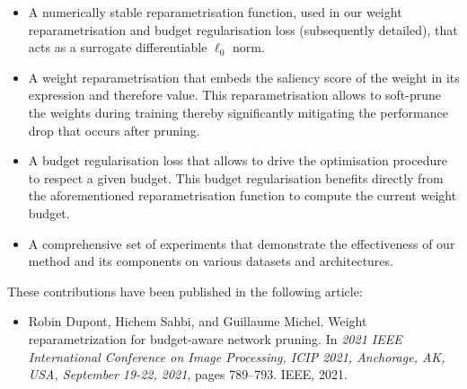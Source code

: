 \begin{itemize}
      \item A numerically stable reparametrisation function, used in our weight
            reparametrisation and budget regularisation loss (subsequently
            detailed), that acts as a surrogate differentiable $\ell_0$ norm.

      \item A weight reparametrisation that embeds the saliency score of the
            weight in its expression and therefore value. This reparametrisation
            allows to soft-prune the weights during training thereby significantly
            mitigating the performance drop that occurs after pruning. \DIFaddbegin {}\DIFaddend 

      \item A budget regularisation loss that allows to drive the optimisation
            procedure to respect a given budget. This budget regularisation
            benefits directly from the aforementioned reparametrisation function
            to compute the current weight budget. \DIFaddbegin {}\DIFaddend 

      \item A comprehensive set of experiments that demonstrate the effectiveness
            of our method and \DIFaddbegin {}\DIFaddend its components on various
            datasets and architectures.\\
\end{itemize}

\noindent These contributions have been published in the following article:
\begin{itemize}
      \item Robin Dupont, Hichem Sahbi, and Guillaume Michel. Weight reparametrization for
            budget-aware network pruning. In \emph{2021 IEEE International Conference on Image
                  Processing, ICIP 2021, Anchorage, AK, USA, September 19-22, 2021}, pages 789–793.
            IEEE, 2021.\\
\end{itemize}



